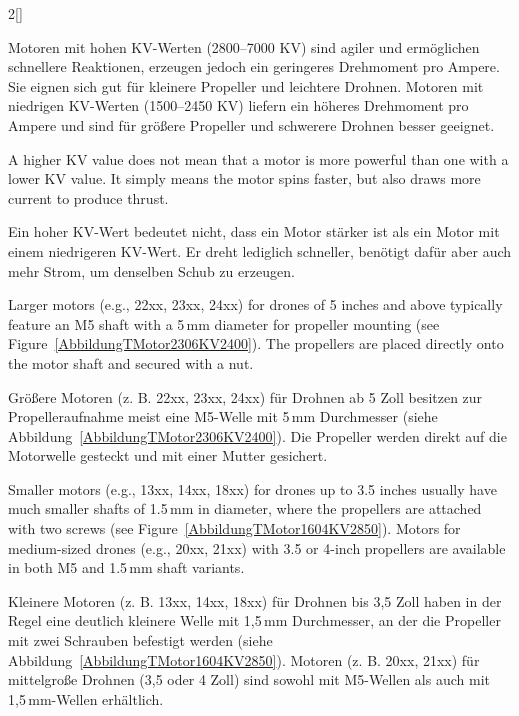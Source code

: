 \begin{paracol}{2}[]
\colger

Motoren mit hohen KV-Werten (2800--7000 KV) sind agiler und ermöglichen schnellere Reaktionen, erzeugen jedoch ein geringeres Drehmoment pro Ampere. Sie eignen sich gut für kleinere Propeller und leichtere Drohnen. Motoren mit niedrigen KV-Werten (1500--2450 KV) liefern ein höheres Drehmoment pro Ampere und sind für größere Propeller und schwerere Drohnen besser geeignet.

\coleng

A higher KV value does not mean that a motor is more powerful than one with a lower KV value. It simply means the motor spins faster, but also draws more current to produce thrust.

\colger

Ein hoher KV-Wert bedeutet nicht, dass ein Motor stärker ist als ein Motor mit einem niedrigeren KV-Wert. Er dreht lediglich schneller, benötigt dafür aber auch mehr Strom, um denselben Schub zu erzeugen.

\colende

\renewcommand{\deutschertitel}{Propelleraufnahme}
\renewcommand{\englischertitel}{Propeller Mounting}
\makrounterabschnitt
\label{AbschnittMotorenPropelleraufnahme}

Larger motors (e.g., 22xx, 23xx, 24xx) for drones of 5 inches and above typically feature an M5 shaft with a 5\,mm diameter for propeller mounting (see Figure~\ref{AbbildungTMotor2306KV2400}). The propellers are placed directly onto the motor shaft and secured with a nut. 

\colger

Größere Motoren (z. B. 22xx, 23xx, 24xx) für Drohnen ab 5 Zoll besitzen zur Propelleraufnahme meist eine M5-Welle mit 5\,mm Durchmesser (siehe Abbildung~\ref{AbbildungTMotor2306KV2400}). Die Propeller werden direkt auf die Motorwelle gesteckt und mit einer Mutter gesichert. 

\coleng

Smaller motors (e.g., 13xx, 14xx, 18xx) for drones up to 3.5 inches usually have much smaller shafts of 1.5\,mm in diameter, where the propellers are attached with two screws (see Figure~\ref{AbbildungTMotor1604KV2850}). Motors for medium-sized drones (e.g., 20xx, 21xx) with 3.5 or 4-inch propellers are available in both M5 and 1.5\,mm shaft variants.

\colger

Kleinere Motoren (z. B. 13xx, 14xx, 18xx) für Drohnen bis 3,5 Zoll haben in der Regel eine deutlich kleinere Welle mit 1,5\,mm Durchmesser, an der die Propeller mit zwei Schrauben befestigt werden (siehe Abbildung~\ref{AbbildungTMotor1604KV2850}). Motoren (z. B. 20xx, 21xx) für mittelgroße Drohnen (3,5 oder 4 Zoll) sind sowohl mit M5-Wellen als auch mit 1,5\,mm-Wellen erhältlich.


\end{paracol}
